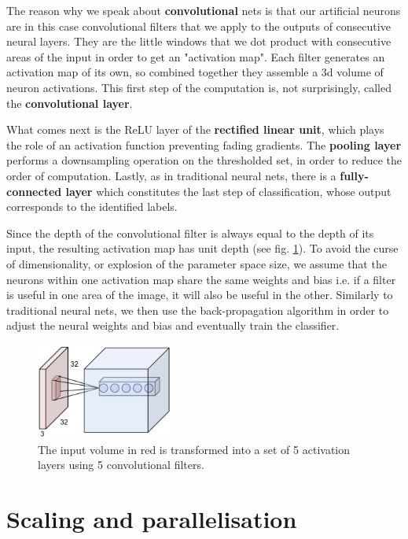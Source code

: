 \documentclass[a4paper, 12pt]{article}
\numberwithin{equation}{section}
\begin{document}
	The reason why we speak about \textbf{convolutional} nets \cite{stanford2016convnets} is that our artificial neurons are in this case convolutional filters that we apply to the outputs of consecutive neural layers. They are the little windows that we dot product with consecutive areas of the input in order to get an "activation map". Each filter generates an activation map of its own, so combined together they assemble a 3d volume of neuron activations. This first step of the computation is, not surprisingly, called the \textbf{convolutional layer}.
	
	What comes next is the ReLU layer of the \textbf{rectified linear unit}, which plays the role of an activation function preventing fading gradients. 
	The \textbf{pooling layer} performs a downsampling operation on the thresholded set, in order to reduce the order of computation.
	Lastly, as in traditional neural nets, there is  a \textbf{fully-connected layer} which constitutes the last step of classification, whose output corresponds to the identified labels.
	
	Since the depth of the convolutional filter is always equal to the depth of its input, the resulting activation map has unit depth (see fig. \ref{fig:conv_net}). To avoid the curse of dimensionality, or explosion of the parameter space size, we assume that the neurons within one activation map share the same weights and bias i.e. if a filter is useful in one area of the image, it will also be useful in the other. Similarly to traditional neural nets, we then use the back-propagation algorithm in order to adjust the neural weights and bias and eventually train the classifier.
	
	\begin{figure}[!h]
		\centering
		\includegraphics[page=1,width=0.40\textwidth]{depthcol.jpeg}
		\caption{\label{fig:conv_net}{The input volume in red is transformed into a set of 5 activation layers using 5 convolutional filters.}}
	\end{figure} 
	
	\section{Scaling and parallelisation}
	
\end{document}
